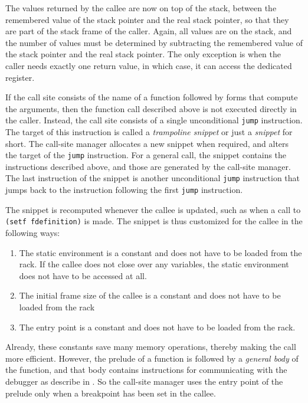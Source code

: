 The values returned by the callee are now on top of the stack, between
the remembered value of the stack pointer and the real stack pointer,
so that they are part of the stack frame of the caller.  Again, all
values are on the stack, and the number of values must be determined
by subtracting the remembered value of the stack pointer and the real
stack pointer.  The only exception is when the caller needs exactly
one return value, in which case, it can access the dedicated register.

If the call site consists of the name of a function followed by forms
that compute the arguments, then the function call described above is
not executed directly in the caller.  Instead, the call site consists
of a single unconditional \texttt{jump} instruction.  The target of
this instruction is called a \emph{trampoline snippet} or just a
\emph{snippet} for short.  The call-site manager allocates a new
snippet when required, and alters the target of the \texttt{jump}
instruction.  For a general call, the snippet contains the
instructions described above, and those are generated by the call-site
manager.  The last instruction of the snippet is another unconditional
\texttt{jump} instruction that jumps back to the instruction following
the first \texttt{jump} instruction.

The snippet is recomputed whenever the callee is updated, such as when
a call to \texttt{(setf fdefinition)} is made.  The snippet is thus
customized for the callee in the following ways:

\begin{enumerate}
\item The static environment is a constant and does not have to be
  loaded from the rack.  If the callee does not close over any
  variables, the static environment does not have to be accessed at
  all.
\item The initial frame size of the callee is a constant and does not
  have to be loaded from the rack
\item The entry point is a constant and does not have to be loaded
  from the rack.
\end{enumerate}

Already, these constants save many memory operations, thereby making
the call more efficient.  However, the prelude of a function is
followed by a \emph{general body} of the function, and that body
contains instructions for communicating with the debugger as describe
in .  So the call-site manager uses the entry
point of the prelude only when a breakpoint has been set in the
callee.

